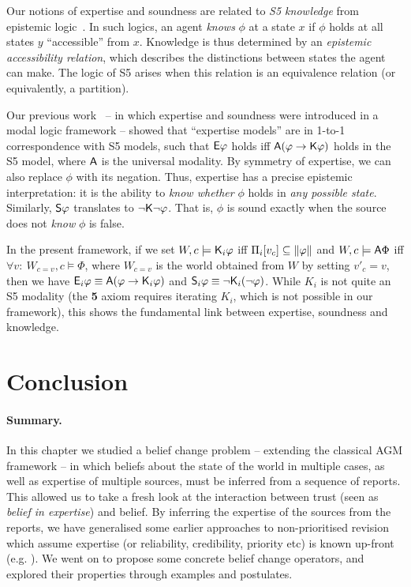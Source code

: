 Our notions of expertise and soundness are related to \emph{S5
knowledge} from epistemic logic~\cite{handbook_epistemic}. In such
logics, an agent \emph{knows} $\phi$ at a state $x$ if $\phi$ holds at all
states $y$ ``accessible'' from $x$. Knowledge is thus determined by an
\emph{epistemic accessibility relation}, which describes the distinctions
between states the agent can make. The logic of S5 arises when this relation is an
equivalence relation (or equivalently, a partition).

Our previous work~\cite{singleton2021logic} -- in which expertise and soundness
were introduced in a modal logic framework -- showed that ``expertise
models'' are in 1-to-1 correspondence with S5 models, such that $\E{\phi}$
holds iff $\A(\phi \limplies \K\phi)$ holds in the S5 model, where $\A$ is the
universal modality. By symmetry of expertise, we can also replace $\phi$ with
its negation. Thus, expertise has a precise epistemic interpretation: it is the
ability to \emph{know whether} $\phi$ holds in \emph{any possible state}.
Similarly, $\S\phi$ translates to $\neg\K\neg\phi$. That is, $\phi$ is sound
exactly when the source does not \emph{know} $\phi$ is false.

In the present framework, if we set
%
$W, c \models \K_i\phi$ iff $\Pi_i[v_c] \subseteq \propmods{\phi}$ and
%
$W, c \models \A\Phi$ iff $\forall v:\ W_{c=v}, c \models \Phi$,
%
where $W_{c=v}$ is the world obtained from $W$ by setting $v'_c = v$, then we
have $\E_i\phi \equiv \A(\phi \limplies \K_i\phi)$ and $\S_i\phi \equiv
\neg \K_i(\neg \phi)$. While $K_i$ is not quite an S5 modality (the \textbf{5}
axiom requires iterating $K_i$, which is not possible in our framework), this
shows the fundamental link between expertise, soundness and knowledge.

\section{Conclusion}
\label{kr_sec_conclusion}

\paragraph{Summary.} In this chapter we studied a belief change problem --
extending the classical AGM framework -- in which
beliefs about the state of the world in multiple cases, as well as expertise of
multiple sources, must be inferred from a sequence of reports. This allowed us
to take a fresh look at the
interaction between trust (seen as \emph{belief in expertise}) and belief.
By inferring the expertise of the sources from the reports,
we have generalised some earlier approaches to non-prioritised
revision which assume expertise (or reliability, credibility, priority
etc) is known up-front (e.g.
\cite{ferme1999selective,hansson_2001,booth_trust_2018,delgrande2006iterated}).
We went on to propose some concrete belief change operators, and explored their
properties through examples and postulates.

